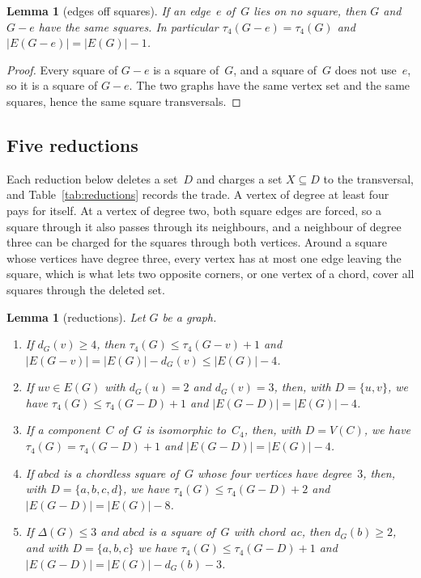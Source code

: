 \documentclass[11pt,letterpaper]{article}
\numberwithin{equation}{section}
\theoremstyle{plain}
\newtheorem{lemma}[theorem]{Lemma}
\theoremstyle{definition}
\theoremstyle{remark}
\begin{document}
\begin{lemma}[edges off squares]\label{lem:offsquare}
If an edge~$e$ of~$G$ lies on no square, then $G$ and $G-e$ have the same squares. In particular $\tau_4(G-e)=\tau_4(G)$ and $|E(G-e)|=|E(G)|-1$.
\end{lemma}

\begin{proof}
Every square of $G-e$ is a square of~$G$, and a square of~$G$ does not use~$e$, so it is a square of $G-e$. The two graphs have the same vertex set and the same squares, hence the same square transversals.
\end{proof}

\subsection{Five reductions}

Each reduction below deletes a set~$D$ and charges a set $X\subseteq D$ to the transversal, and Table~\ref{tab:reductions} records the trade. A vertex of degree at least four pays for itself. At a vertex of degree two, both square edges are forced, so a square through it also passes through its neighbours, and a neighbour of degree three can be charged for the squares through both vertices. Around a square whose vertices have degree three, every vertex has at most one edge leaving the square, which is what lets two opposite corners, or one vertex of a chord, cover all squares through the deleted set.

\begin{lemma}[reductions]\label{lem:reductions}
Let $G$ be a graph.
\begin{enumerate}[label=\textup{(\alph*)}]
\item\label{red:deg4} If $d_G(v)\ge4$, then $\tau_4(G)\le\tau_4(G-v)+1$ and $|E(G-v)|=|E(G)|-d_G(v)\le|E(G)|-4$.
\item\label{red:mixed} If $uv\in E(G)$ with $d_G(u)=2$ and $d_G(v)=3$, then, with $D=\{u,v\}$, we have $\tau_4(G)\le\tau_4(G-D)+1$ and $|E(G-D)|=|E(G)|-4$.
\item\label{red:comp} If a component~$C$ of~$G$ is isomorphic to~$C_4$, then, with $D=V(C)$, we have $\tau_4(G)=\tau_4(G-D)+1$ and $|E(G-D)|=|E(G)|-4$.
\item\label{red:chordless} If $abcd$ is a chordless square of~$G$ whose four vertices have degree~$3$, then, with $D=\{a,b,c,d\}$, we have $\tau_4(G)\le\tau_4(G-D)+2$ and $|E(G-D)|=|E(G)|-8$.
\item\label{red:chord} If $\Delta(G)\le3$ and $abcd$ is a square of~$G$ with chord~$ac$, then $d_G(b)\ge2$, and with $D=\{a,b,c\}$ we have $\tau_4(G)\le\tau_4(G-D)+1$ and $|E(G-D)|=|E(G)|-d_G(b)-3$.
\end{enumerate}
\end{lemma}
\end{document}
